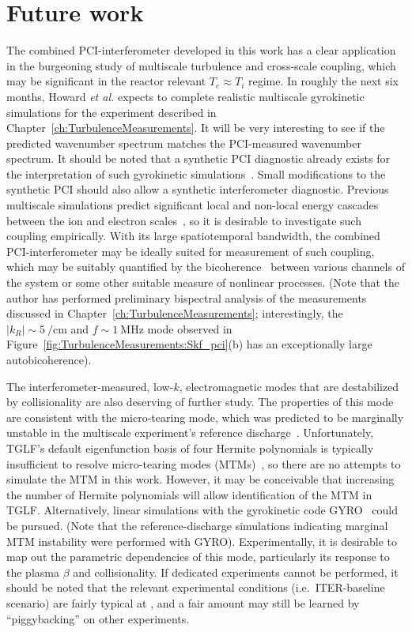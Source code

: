 \section{Future work}
\label{sec:Conclusions:future_work}
The combined PCI-interferometer developed in this work
has a clear application in the burgeoning study
of multiscale turbulence and cross-scale coupling, which
may be significant in the reactor relevant $T_e \approx T_i$ regime.
In roughly the next six months,
Howard \emph{et al.} expects to complete
realistic multiscale gyrokinetic simulations
for the experiment described in
Chapter~\ref{ch:TurbulenceMeasurements}.
It will be very interesting
to see if the predicted wavenumber spectrum
matches the PCI-measured wavenumber spectrum.
It should be noted that a synthetic PCI diagnostic
already exists for the interpretation
of such gyrokinetic simulations~\cite{rost_pp10}.
Small modifications to the synthetic PCI
should also allow a synthetic interferometer diagnostic.
Previous multiscale simulations predict
significant local and non-local energy cascades
between the ion and electron scales~\cite{howard_pp16}, so
it is desirable to investigate such coupling empirically.
With its large spatiotemporal bandwidth,
the combined PCI-interferometer may be ideally suited
for measurement of such coupling, which
may be suitably quantified by
the bicoherence~\cite{young_and_powers_ieee79}
between various channels of the system or
some other suitable measure of nonlinear processes.
(Note that the author has performed preliminary bispectral analysis
of the measurements discussed in
Chapter~\ref{ch:TurbulenceMeasurements};
interestingly, the $|k_R| \sim \SI{5}{\per\centi\meter}$ and
$f \sim \SI{1}{\mega\hertz}$ mode observed in
Figure~\ref{fig:TurbulenceMeasurements:Skf_pci}(b)
has an exceptionally large autobicoherence).

The interferometer-measured, low-$k$, electromagnetic modes
that are destabilized by collisionality
are also deserving of further study.
The properties of this mode are consistent
with the micro-tearing mode, which
was predicted to be marginally unstable
in the multiscale experiment's reference discharge~\cite{holland_nf17}.
Unfortunately, TGLF's default eigenfunction basis
of four Hermite polynomials is typically insufficient
to resolve micro-tearing modes (MTMs)~\cite{staebler_MTM_question}, so
there are no attempts to simulate the MTM in this work.
However, it may be conceivable that
increasing the number of Hermite polynomials
will allow identification of the MTM in TGLF.
Alternatively, linear simulations with
the gyrokinetic code GYRO~\cite{candy_jcp03}
could be pursued.
(Note that the reference-discharge simulations
indicating marginal MTM instability were performed with GYRO).
Experimentally, it is desirable to map out the parametric dependencies
of this mode, particularly its response
to the plasma $\beta$ and collisionality.
If dedicated experiments cannot be performed,
it should be noted that the relevant experimental conditions
(i.e.\ ITER-baseline scenario) are fairly typical at \diiid, and
a fair amount may still be learned
by ``piggybacking'' on other experiments.

